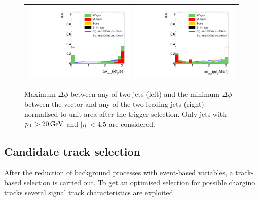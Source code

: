 \begin{figure}[!t]
  \centering 
  \begin{tabular}{c}
    \includegraphics[width=0.49\textwidth]{figures/analysis/AnalysisSelection/chiTrackstriggerRequirementsTrigger_2Signals_FullBkg/hDeltaPhiMaxbeforeCut_lin.pdf}
    \includegraphics[width=0.49\textwidth]{figures/analysis/AnalysisSelection/chiTrackstriggerRequirementsTrigger_2Signals_FullBkg/hDeltaPhiJetMetMinbeforeCut_lin.pdf}
  \end{tabular}
  \caption{Maximum $\Delta \phi$ between any of two jets (left) and the minimum $\Delta \phi$  between the \met vector and any of the two leading jets (right) normalised to unit area after the trigger selection.
           Only jets with $p_{\text{T}}>20\,\text{Ge}\kern-0.06667em\text{V}$ and $|\eta|<4.5$ are considered.}
  \label{fig:QCDcuts}
\end{figure}
\hspace{0.9cm}

\subsection{Candidate track selection}
\label{sec:CandidateTrackSelection}
After the reduction of background processes with event-based variables, a track-based selection is carried out.
To get an optimised selection for possible chargino tracks several signal track characteristics are exploited.\\

